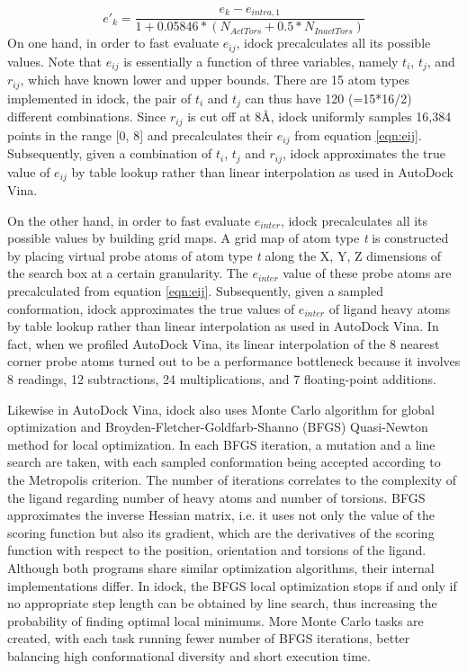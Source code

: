 \documentclass[10pt]{article}
\begin{document}
\begin{equation}
\label{eqn:FlexibilityPenalty}
e'_k = \frac{e_k - e_{intra,1}}{1 + 0.05846 * (N_{ActTors} + 0.5 * N_{InactTors})}
\end{equation}
On one hand, in order to fast evaluate $e_{ij}$, idock precalculates all its possible values. Note that $e_{ij}$ is essentially a function of three variables, namely $t_i$, $t_j$, and $r_{ij}$, which have known lower and upper bounds. There are 15 atom types implemented in idock, the pair of $t_i$ and $t_j$ can thus have 120 (=15*16/2) different combinations. Since $r_{ij}$ is cut off at 8\AA, idock uniformly samples 16,384 points in the range [0, 8] and precalculates their $e_{ij}$ from equation \eqref{eqn:eij}. Subsequently, given a combination of $t_i$, $t_j$ and $r_{ij}$, idock approximates the true value of $e_{ij}$ by table lookup rather than linear interpolation as used in AutoDock Vina.

On the other hand, in order to fast evaluate $e_{inter}$, idock precalculates all its possible values by building grid maps. A grid map of atom type \textit{t} is constructed by placing virtual probe atoms of atom type \textit{t} along the X, Y, Z dimensions of the search box at a certain granularity. The $e_{inter}$ value of these probe atoms are precalculated from equation \eqref{eqn:eij}. Subsequently, given a sampled conformation, idock approximates the true values of $e_{inter}$ of ligand heavy atoms by table lookup rather than linear interpolation as used in AutoDock Vina. In fact, when we profiled AutoDock Vina, its linear interpolation of the 8 nearest corner probe atoms turned out to be a performance bottleneck because it involves 8 readings, 12 subtractions, 24 multiplications, and 7 floating-point additions.

Likewise in AutoDock Vina, idock also uses Monte Carlo algorithm for global optimization and Broyden-Fletcher-Goldfarb-Shanno (BFGS) \cite{786} Quasi-Newton method for local optimization. In each BFGS iteration, a mutation and a line search are taken, with each sampled conformation being accepted according to the Metropolis criterion. The number of iterations correlates to the complexity of the ligand regarding number of heavy atoms and number of torsions. BFGS approximates the inverse Hessian matrix, i.e. it uses not only the value of the scoring function but also its gradient, which are the derivatives of the scoring function with respect to the position, orientation and torsions of the ligand. Although both programs share similar optimization algorithms, their internal implementations differ. In idock, the BFGS local optimization stops if and only if no appropriate step length can be obtained by line search, thus increasing the probability of finding optimal local minimums. More Monte Carlo tasks are created, with each task running fewer number of BFGS iterations, better balancing high conformational diversity and short execution time.
\end{document}
